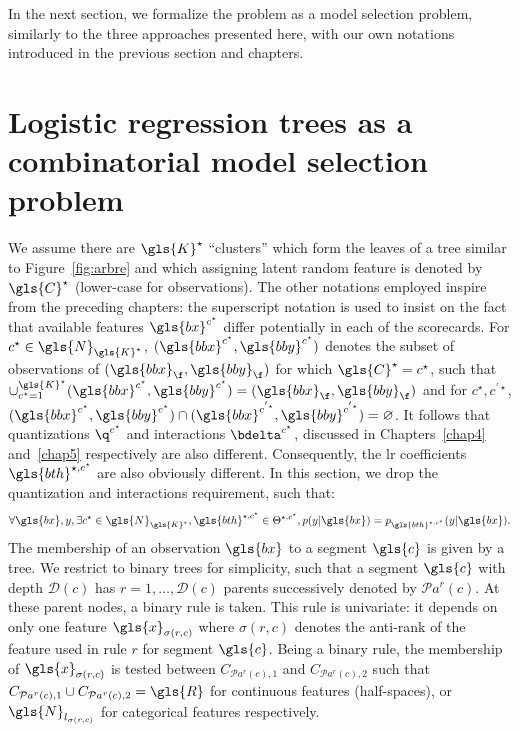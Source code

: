 In the next section, we formalize the problem as a model selection problem, similarly to the three approaches presented here, with our own notations introduced in the previous section and chapters.


\section{Logistic regression trees as a combinatorial model selection problem} \label{sec:model_selec_tree}

We assume there are $\gls{K}^\star$ ``clusters'' which form the leaves of a tree similar to Figure~\ref{fig:arbre} and which assigning latent random feature is denoted by $\gls{C}^\star$ (lower-case for observations). The other notations employed inspire from the preceding chapters: the superscript notation is used to insist on the fact that available features $\gls{bx}^{c^\star}$ differ potentially in each of the scorecards. For $c^\star \in \gls{N}_{\gls{K}^\star}$, $(\gls{bbx}^{c^\star}, \gls{bby}^{c^\star})$ denotes the subset of observations of $(\gls{bbx}_\f, \gls{bby}_\f)$ for which $\gls{C}^\star = c^\star$, such that $\cup_{c^\star=1}^{\gls{K}^\star} (\gls{bbx}^{c^\star}, \gls{bby}^{c^\star}) = (\gls{bbx}_\f, \gls{bby}_\f)$ and for $c^\star, c^{'\star}$, $(\gls{bbx}^{c^\star}, \gls{bby}^{c^\star}) \cap (\gls{bbx}^{c^{'\star}}, \gls{bby}^{c^{'\star}}) = \varnothing$. It follows that quantizations $\q^{c^\star}$ and interactions $\bdelta^{c^\star}$, discussed in Chapters~\ref{chap4} and~\ref{chap5} respectively are also different. Consequently, the \gls{lr} coefficients $\gls{bth}^{\star,c^\star}$ are also obviously different. In this section, we drop the quantization and interactions requirement, such that:
\begin{equation} \label{eq:lr_tree}
\forall \gls{bx}, y, \exists c^\star \in \gls{N}_{\gls{K}^\star}, \gls{bth}^{\star,c^\star} \in \Theta^{\star,c^\star}, p(y | \gls{bx}) = p_{\gls{bth}^{\star,c^\star}}(y | \gls{bx}).
\end{equation}
The membership of an observation $\gls{bx}$ to a segment $\gls{c}$ is given by a tree. We restrict to binary trees for simplicity, such that a segment $\gls{c}$ with depth $\mathcal{D}(c)$ has $r = 1, \dots, \mathcal{D}(c)$ parents successively denoted by $\mathcal{P}a^r(c)$. At these parent nodes, a binary rule is taken. This rule is univariate: it depends on only one feature $\gls{x}_{\sigma(r,c)}$ where $\sigma(r,c)$ denotes the anti-rank of the feature used in rule $r$ for segment $\gls{c}$. Being a binary rule, the membership of $\gls{x}_{\sigma(r,c)}$ is tested between $C_{\mathcal{P}a^r(c),1}$ and $C_{\mathcal{P}a^r(c),2}$ such that $C_{\mathcal{P}a^r(c),1} \cup C_{\mathcal{P}a^r(c),2} =\gls{R}$ for continuous features (half-spaces), or $\gls{N}_{l_{\sigma(r,c)}}$ for categorical features respectively. 
